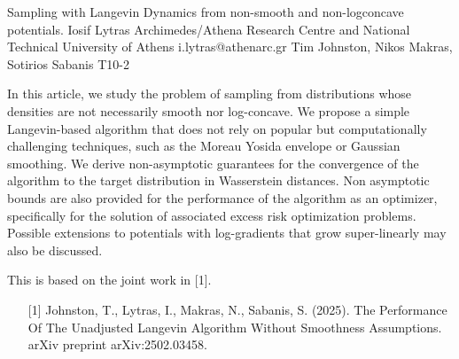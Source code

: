 \begin{talk}
  {Sampling with Langevin Dynamics from non-smooth and non-logconcave potentials.}
  {Iosif Lytras}
  {Archimedes/Athena Research Centre and National Technical University of Athens}%
  {i.lytras@athenarc.gr}%
  {Tim Johnston, Nikos Makras, Sotirios Sabanis}  %
  {T10-2}%
			
In this article, we study the problem of sampling from distributions whose densities are not necessarily smooth nor log-concave. We propose a simple Langevin-based algorithm that does not rely on popular but computationally challenging techniques, such as the Moreau Yosida envelope or Gaussian smoothing. We derive non-asymptotic guarantees for the convergence of the algorithm to the target distribution in Wasserstein distances. Non asymptotic bounds are also provided for the performance of the algorithm as an optimizer, specifically for the solution of associated excess risk optimization problems.\\
Possible extensions to potentials with log-gradients that grow super-linearly may also be discussed.

This is based on the joint work in [1].
\medskip

\begin{enumerate}
    \item [{[1]}] Johnston, T., Lytras, I., Makras, N., Sabanis, S. (2025). The Performance Of The Unadjusted Langevin Algorithm Without Smoothness Assumptions. arXiv preprint arXiv:2502.03458.
\end{enumerate}
\end{talk}

